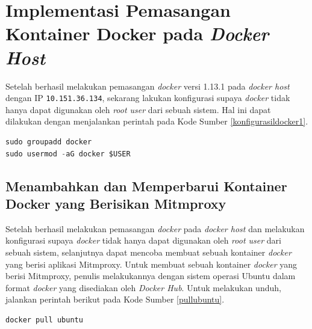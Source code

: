 \section{Implementasi Pemasangan Kontainer Docker pada \textit{Docker Host}}
Setelah berhasil melakukan pemasangan \textit{docker} versi 1.13.1 pada \textit{docker host} dengan IP \texttt{10.151.36.134}, sekarang lakukan konfigurasi supaya \textit{docker} tidak hanya dapat digunakan oleh \textit{root user} dari sebuah sistem. Hal ini dapat dilakukan dengan menjalankan perintah pada Kode Sumber \ref{konfigurasildocker1}.
\newline
\begin{lstlisting}[frame=single,tabsize=2,breaklines,captionpos=b,caption=Perintah untuk installasi Ansible,language=Python,label=konfigurasildocker1]
sudo groupadd docker
sudo usermod -aG docker $USER
\end{lstlisting}

\subsection{Menambahkan dan Memperbarui Kontainer Docker yang Berisikan Mitmproxy}
Setelah berhasil melakukan pemasangan \textit{docker} pada \textit{docker host} dan melakukan konfigurasi supaya \textit{docker} tidak hanya dapat digunakan oleh \textit{root user} dari sebuah sistem, selanjutnya dapat mencoba membuat sebuah kontainer \textit{docker} yang berisi aplikasi Mitmproxy. Untuk membuat sebuah kontainer \textit{docker} yang berisi Mitmproxy, penulis melakukannya dengan sistem operasi Ubuntu dalam format \textit{docker} yang disediakan oleh \textit{Docker Hub}. Untuk melakukan unduh, jalankan perintah berikut pada Kode Sumber \ref{pullubuntu}.
\newline
\begin{lstlisting}[frame=single,tabsize=2,breaklines,captionpos=b,caption=Perintah untuk \textit{Pull} Ubuntu,language=Python,label=pullubuntu]
docker pull ubuntu
\end{lstlisting}

